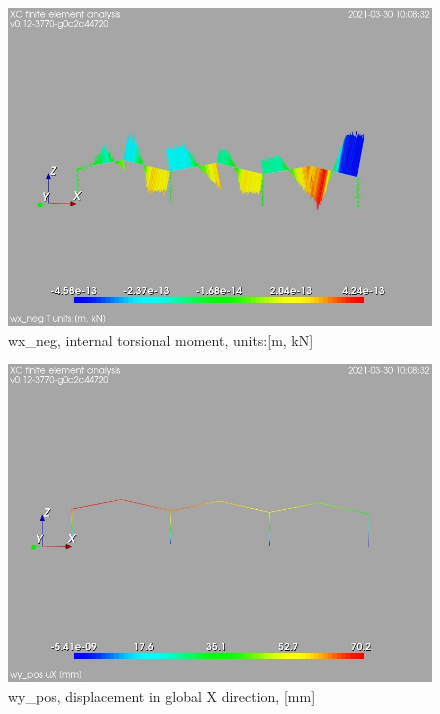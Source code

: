 \begin{figure}
\begin{center}
\includegraphics[width=\linewidth]{calc_results/sole_zeinali/text/graphics/resSimplLC/wx_negallMemberSetT}
\caption{wx_neg, internal torsional moment, units:[m, kN]}
\end{center}
\end{figure}
\cleardoublepage
\begin{figure}
\begin{center}
\includegraphics[width=\linewidth]{calc_results/sole_zeinali/text/graphics/resSimplLC/wy_postotaluX}
\caption{wy_pos, displacement in global X direction, [mm]}
\end{center}
\end{figure}

